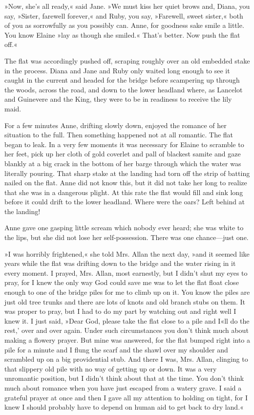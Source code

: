 »Now, she’s all ready,« said Jane. »We must kiss her quiet brows and, Diana, you say, »Sister, farewell forever,« and Ruby, you say, »Farewell, sweet sister,« both of you as sorrowfully as you possibly can. Anne, for goodness sake smile a little. You know Elaine »lay as though she smiled.« That’s better. Now push the flat off.«

The flat was accordingly pushed off, scraping roughly over an old embedded stake in the process. Diana and Jane and Ruby only waited long enough to see it caught in the current and headed for the bridge before scampering up through the woods, across the road, and down to the lower headland where, as Lancelot and Guinevere and the King, they were to be in readiness to receive the lily maid.

For a few minutes Anne, drifting slowly down, enjoyed the romance of her situation to the full. Then something happened not at all romantic. The flat began to leak. In a very few moments it was necessary for Elaine to scramble to her feet, pick up her cloth of gold coverlet and pall of blackest samite and gaze blankly at a big crack in the bottom of her barge through which the water was literally pouring. That sharp stake at the landing had torn off the strip of batting nailed on the flat. Anne did not know this, but it did not take her long to realize that she was in a dangerous plight. At this rate the flat would fill and sink long before it could drift to the lower headland. Where were the oars? Left behind at the landing!

Anne gave one gasping little scream which nobody ever heard; she was white to the lips, but she did not lose her self-possession. There was one chance—just one.

»I was horribly frightened,« she told Mrs. Allan the next day, »and it seemed like years while the flat was drifting down to the bridge and the water rising in it every moment. I prayed, Mrs. Allan, most earnestly, but I didn’t shut my eyes to pray, for I knew the only way God could save me was to let the flat float close enough to one of the bridge piles for me to climb up on it. You know the piles are just old tree trunks and there are lots of knots and old branch stubs on them. It was proper to pray, but I had to do my part by watching out and right well I knew it. I just said, »Dear God, please take the flat close to a pile and I«ll do the rest,’ over and over again. Under such circumstances you don’t think much about making a flowery prayer. But mine was answered, for the flat bumped right into a pile for a minute and I flung the scarf and the shawl over my shoulder and scrambled up on a big providential stub. And there I was, Mrs. Allan, clinging to that slippery old pile with no way of getting up or down. It was a very unromantic position, but I didn’t think about that at the time. You don’t think much about romance when you have just escaped from a watery grave. I said a grateful prayer at once and then I gave all my attention to holding on tight, for I knew I should probably have to depend on human aid to get back to dry land.«

